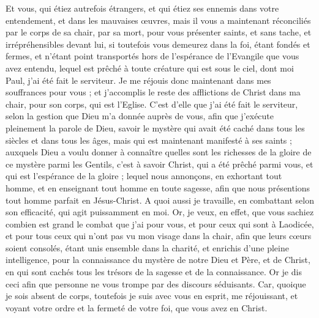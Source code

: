\begin{multicols}{2}
Et vous, qui étiez autrefois étrangers, et qui étiez ses ennemis dans votre entendement, et dans les mauvaises œuvres, mais il vous a maintenant réconciliés 
par le corps de sa chair, par sa mort, pour vous présenter saints, et sans tache, et irrépréhensibles devant lui,
si toutefois vous demeurez dans la foi, étant fondés et fermes, et n'étant point transportés hors de l'espérance de l'Evangile que vous avez entendu, lequel est prêché à toute créature qui est sous le ciel, dont moi Paul, j'ai été fait le serviteur.
Je me réjouis donc maintenant dans mes souffrances pour vous ; et j'accomplis le reste des afflictions de Christ dans ma chair, pour son corps, qui est l'Eglise.
C'est d'elle que j'ai été fait le serviteur, selon la gestion que Dieu m'a donnée auprès de vous, afin que j'exécute pleinement la parole de Dieu,
savoir le mystère qui avait été caché dans tous les siècles et dans tous les âges, mais qui est maintenant manifesté à ses saints ;
auxquels Dieu a voulu donner à connaître quelles sont les richesses de la gloire de ce mystère parmi les Gentils, c'est à savoir Christ, qui a été prêché parmi vous, et qui est l'espérance de la gloire ; 
lequel nous annonçons, en exhortant tout homme, et en enseignant tout homme en toute sagesse, afin que nous présentions tout homme parfait en Jésus-Christ.
A quoi aussi je travaille, en combattant selon son efficacité, qui agit puissamment en moi.
\VerseOne{}Or, je veux, en effet, que vous sachiez combien est grand le combat que j'ai pour vous, et pour ceux qui sont à Laodicée, et pour tous ceux qui n'ont pas vu mon visage dans la chair,
afin que leurs cœurs soient consolés, étant unis ensemble dans la charité, et enrichis d'une pleine intelligence, pour la connaissance du mystère de notre Dieu et Père, et de Christ,
en qui sont cachés tous les trésors de la sagesse et de la connaissance.
Or je dis ceci afin que personne ne vous trompe par des discours séduisants.
Car, quoique je sois absent de corps, toutefois je suis avec vous en esprit, me réjouissant, et voyant votre ordre et la fermeté de votre foi, que vous avez en Christ.

\end{multicols}
